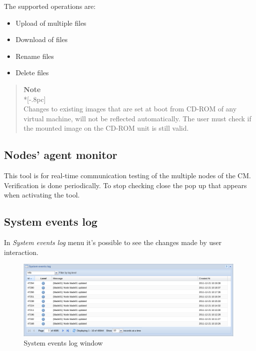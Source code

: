 The supported operations are:
\begin{itemize}
\item Upload of multiple files
\item Download of files
\item Rename files
\item Delete files
\end{itemize}


\begin{quote}
	{\large \bf Note} \\*[-.8pc]
	\underline{\hspace{6in}} \\
    Changes to existing images that are set at boot from CD-ROM of any virtual machine, will not be reflected automatically. The user must check if the mounted image on the CD-ROM unit is still valid.
\end{quote}

\subsection{Nodes' agent monitor}
This tool is for real-time communication testing of the multiple nodes of the CM. Verification is done periodically.
To stop checking close the pop up that appears when activating the tool.

\subsection{System events log}
\label{sec:system_event_reg}

In \emph{System events log} menu it's possible to see the changes made by user interaction.

\begin{figure}[H]
	\begin{center}
	\includegraphics[scale=0.4]{screenshots/events_log.png}
	\caption{System events log window}
	\label{fig:events_log}
	\end{center}
\end{figure}

